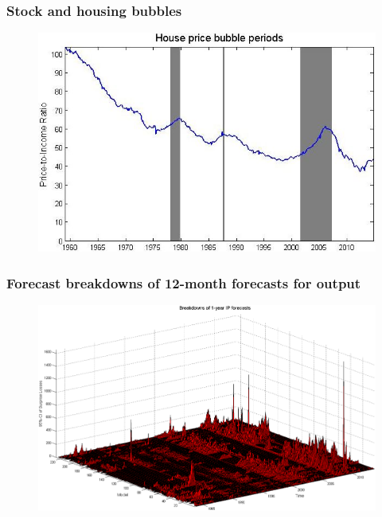 \documentclass [handout] {beamer} %
\begin{document}
\begin{frame}
\frametitle{Stock and housing bubbles}
\begin{figure}[htb]
  \centering
    \includegraphics[width=\textwidth]{housebubble.jpg}
\end{figure}
\end{frame}

\begin{frame}
\frametitle{Forecast breakdowns of 12-month forecasts for output}
\begin{figure}[htb]
  \centering
    \includegraphics[width=\textwidth]{breakdowns.png}
\end{figure}
\end{frame}
		
\appendix
{}
\setcounter{finalframe}{\value{framenumber}}
	
\newcommand{\LastPageText}{Thank you.}
\begin{frame}[plain]
	\lastpage
\end{frame}

\begin{frame}[allowframebreaks]
\begin{small}

\end{small}
\end{frame}
%		

	
\end{document}
